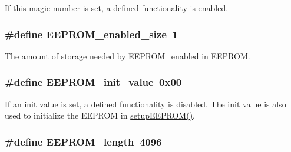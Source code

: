 If this magic number is set, a defined functionality is enabled. 

\hypertarget{WIFIOnOff_8ino_a11fbf1b754b9209b6bdd4ebcb0c3e677}{
\subsubsection[{E\-E\-P\-R\-O\-M\-\_\-enabled\-\_\-size}]{\setlength{\rightskip}{0pt plus 5cm}\#define E\-E\-P\-R\-O\-M\-\_\-enabled\-\_\-size~1}}\label{WIFIOnOff_8ino_a11fbf1b754b9209b6bdd4ebcb0c3e677}


The amount of storage needed by \hyperlink{WIFIOnOff_8ino_a06c93cd8175c0a438c20922e313645bd}{E\-E\-P\-R\-O\-M\-\_\-enabled} in E\-E\-P\-R\-O\-M. 

\hypertarget{WIFIOnOff_8ino_a6912b1d0bb01613405a6827632e6d6f4}{
\subsubsection[{E\-E\-P\-R\-O\-M\-\_\-init\-\_\-value}]{\setlength{\rightskip}{0pt plus 5cm}\#define E\-E\-P\-R\-O\-M\-\_\-init\-\_\-value~0x00}}\label{WIFIOnOff_8ino_a6912b1d0bb01613405a6827632e6d6f4}


If an init value is set, a defined functionality is disabled. The init value is also used to initialize the E\-E\-P\-R\-O\-M in \hyperlink{WIFIOnOff_8ino_a3d5cf434e34fce7db249185369616a32}{setup\-E\-E\-P\-R\-O\-M()}. 

\hypertarget{WIFIOnOff_8ino_af7399e3a75be0250095968af4f94757e}{
\subsubsection[{E\-E\-P\-R\-O\-M\-\_\-length}]{\setlength{\rightskip}{0pt plus 5cm}\#define E\-E\-P\-R\-O\-M\-\_\-length~4096}}\label{WIFIOnOff_8ino_af7399e3a75be0250095968af4f94757e}


